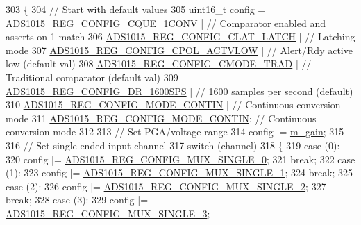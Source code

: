 \begin{DoxyCode}
303 \{
304   \textcolor{comment}{// Start with default values}
305   uint16\_t config = \hyperlink{_cool_adafruit___a_d_s1015_8h_a4889b7e8a019906eb7c2670ec2466917}{ADS1015\_REG\_CONFIG\_CQUE\_1CONV}   | \textcolor{comment}{// Comparator enabled
       and asserts on 1 match}
306                     \hyperlink{_cool_adafruit___a_d_s1015_8h_af7f9528dd1aee135afad4c44d771b9f6}{ADS1015\_REG\_CONFIG\_CLAT\_LATCH}   | \textcolor{comment}{// Latching mode}
307                     \hyperlink{_cool_adafruit___a_d_s1015_8h_a775f732c7e97574b38858820b96cf771}{ADS1015\_REG\_CONFIG\_CPOL\_ACTVLOW} | \textcolor{comment}{// Alert/Rdy active
       low   (default val)}
308                     \hyperlink{_cool_adafruit___a_d_s1015_8h_afb5240325d7ec757ccad7b098a2b93c3}{ADS1015\_REG\_CONFIG\_CMODE\_TRAD}   | \textcolor{comment}{// Traditional
       comparator (default val)}
309                     \hyperlink{_cool_adafruit___a_d_s1015_8h_aa4665026711a8587430d9235dbc4ccf0}{ADS1015\_REG\_CONFIG\_DR\_1600SPS}   | \textcolor{comment}{// 1600 samples per
       second (default)}
310                     \hyperlink{_cool_adafruit___a_d_s1015_8h_afbb1b96a1b61fae1301ed075330d3a20}{ADS1015\_REG\_CONFIG\_MODE\_CONTIN}  | \textcolor{comment}{// Continuous
       conversion mode}
311                     \hyperlink{_cool_adafruit___a_d_s1015_8h_afbb1b96a1b61fae1301ed075330d3a20}{ADS1015\_REG\_CONFIG\_MODE\_CONTIN};   \textcolor{comment}{// Continuous
       conversion mode}
312 
313   \textcolor{comment}{// Set PGA/voltage range}
314   config |= \hyperlink{class_adafruit___a_d_s1015_a8db90fe03d55a18246984ba2ba5e7f32}{m\_gain};
315                     
316   \textcolor{comment}{// Set single-ended input channel}
317   \textcolor{keywordflow}{switch} (channel)
318   \{
319     \textcolor{keywordflow}{case} (0):
320       config |= \hyperlink{_cool_adafruit___a_d_s1015_8h_a95d034ea82362b3f6573492209aac4f2}{ADS1015\_REG\_CONFIG\_MUX\_SINGLE\_0};
321       \textcolor{keywordflow}{break};
322     \textcolor{keywordflow}{case} (1):
323       config |= \hyperlink{_cool_adafruit___a_d_s1015_8h_a2db511c8817fda53e31b5d1f72601909}{ADS1015\_REG\_CONFIG\_MUX\_SINGLE\_1};
324       \textcolor{keywordflow}{break};
325     \textcolor{keywordflow}{case} (2):
326       config |= \hyperlink{_cool_adafruit___a_d_s1015_8h_ae31fb46fbe9801ae7bb9210e88b7162d}{ADS1015\_REG\_CONFIG\_MUX\_SINGLE\_2};
327       \textcolor{keywordflow}{break};
328     \textcolor{keywordflow}{case} (3):
329       config |= \hyperlink{_cool_adafruit___a_d_s1015_8h_a9cb6f8bf1d45341e508cece5bcbc7841}{ADS1015\_REG\_CONFIG\_MUX\_SINGLE\_3};

\end{DoxyCode}
